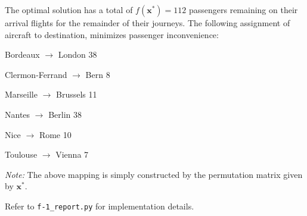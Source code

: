 \documentclass[8pt,oneside]{extarticle}
\newcommand{\vect}[1]{\boldsymbol{#1}}
\begin{document}
The optimal solution has a total of $f\left(\vect{x}^*\right)= 112$ passengers remaining on their arrival flights for the
remainder of their journeys. The following assignment of aircraft to destination, minimizes passenger
inconvenience:
\medskip

Bordeaux $\rightarrow$ London 38

Clermon-Ferrand $\rightarrow$ Bern 8

Marseille $\rightarrow$ Brussels 11

Nantes $\rightarrow$ Berlin 38

Nice $\rightarrow$ Rome 10

Toulouse $\rightarrow$ Vienna 7

\medskip
\emph{Note:} The above mapping is simply constructed by the permutation matrix given by $\vect{x}^*$.

Refer to \texttt{f-1\_report.py}
for implementation details.
\end{document}
